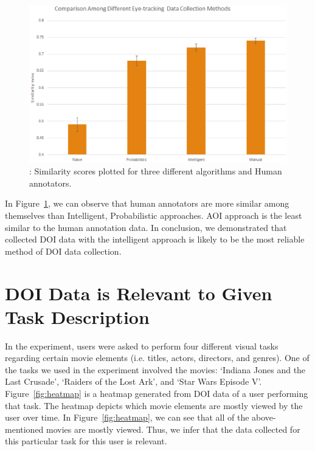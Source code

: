 \begin{figure}[htb]
  \centering
  \includegraphics[width=0.99\linewidth]{images/Similarity.eps}
  \caption{: Similarity scores plotted for three different algorithms and Human annotators.}
	\label{fig:Similarity}
\end{figure}

In Figure~\ref{fig:Similarity}, we can observe that human annotators are more similar among themselves than Intelligent, Probabilistic approaches. AOI approach is the least similar to the human annotation data. In conclusion, we demonstrated that collected DOI data with the intelligent approach is likely to be the most reliable method of DOI data collection. 

\section{DOI Data is Relevant to Given Task Description}
In the experiment, users were asked to perform four different visual tasks regarding certain movie elements (i.e. titles, actors, directors, and genres). One of the tasks we used in the experiment involved the movies: `Indiana Jones and the Last Crusade', `Raiders of the Lost Ark', and `Star Wars Episode V'. Figure~\ref{fig:heatmap} is a heatmap generated from DOI data of a user performing that task. The heatmap depicts which movie elements are mostly viewed by the user over time. In Figure~\ref{fig:heatmap}, we can see that all of the above-mentioned movies are mostly viewed. Thus, we infer that the data collected for this particular task for this user is relevant. 


